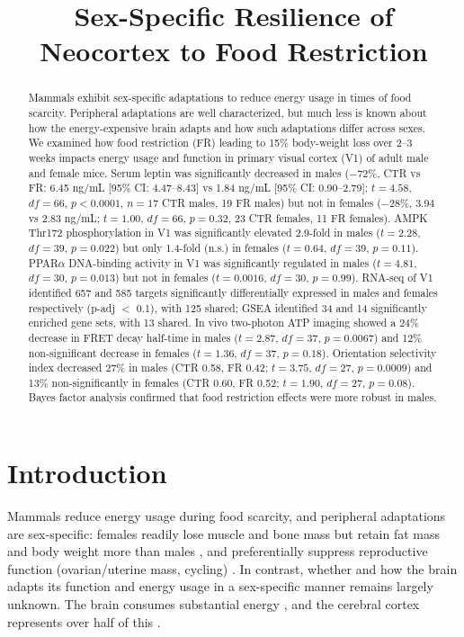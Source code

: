 \documentclass[11pt]{article}
\title{Sex-Specific Resilience of Neocortex to Food Restriction}
\author{}
\date{}
\begin{document}
\maketitle

\begin{abstract}
Mammals exhibit sex-specific adaptations to reduce energy usage in times of food scarcity. Peripheral adaptations are well characterized, but much less is known about how the energy-expensive brain adapts and how such adaptations differ across sexes. We examined how food restriction (FR) leading to 15\% body-weight loss over 2--3 weeks impacts energy usage and function in primary visual cortex (V1) of adult male and female mice. Serum leptin was significantly decreased in males ($-$72\%, CTR vs FR: 6.45 ng/mL [95\% CI: 4.47--8.43] vs 1.84 ng/mL [95\% CI: 0.90--2.79]; $t = 4.58$, $df = 66$, $p < 0.0001$, $n = 17$ CTR males, 19 FR males) but not in females ($-$28\%, 3.94 vs 2.83 ng/mL; $t = 1.00$, $df = 66$, $p = 0.32$, 23 CTR females, 11 FR females). AMPK Thr172 phosphorylation in V1 was significantly elevated 2.9-fold in males ($t = 2.28$, $df = 39$, $p = 0.022$) but only 1.4-fold (n.s.) in females ($t = 0.64$, $df = 39$, $p = 0.11$). PPAR$\alpha$ DNA-binding activity in V1 was significantly regulated in males ($t = 4.81$, $df = 30$, $p = 0.013$) but not in females ($t = 0.0016$, $df = 30$, $p = 0.99$). RNA-seq of V1 identified 657 and 585 targets significantly differentially expressed in males and females respectively (p-adj $<$ 0.1), with 125 shared; GSEA identified 34 and 14 significantly enriched gene sets, with 13 shared. In vivo two-photon ATP imaging showed a 24\% decrease in FRET decay half-time in males ($t = 2.87$, $df = 37$, $p = 0.0067$) and 12\% non-significant decrease in females ($t = 1.36$, $df = 37$, $p = 0.18$). Orientation selectivity index decreased 27\% in males (CTR 0.58, FR 0.42; $t = 3.75$, $df = 27$, $p = 0.0009$) and 13\% non-significantly in females (CTR 0.60, FR 0.52; $t = 1.90$, $df = 27$, $p = 0.08$). Bayes factor analysis confirmed that food restriction effects were more robust in males.
\end{abstract}

\section{Introduction}
Mammals reduce energy usage during food scarcity, and peripheral adaptations are sex-specific: females readily lose muscle and bone mass but retain fat mass and body weight more than males \cite{lamont2008gender,fontana2009aging,manzanares2019cognitive,palmer2017sexual,mitchell2016effects,shi2020sex}, and preferentially suppress reproductive function (ovarian/uterine mass, cycling) \cite{wade1996metabolic,nelson1997reproduction,caligioni2009assessing}. In contrast, whether and how the brain adapts its function and energy usage in a sex-specific manner remains largely unknown. The brain consumes substantial energy \cite{attwell2001energy,harris2012synaptic,niven2016neuronal}, and the cerebral cortex represents over half of this \cite{harris2012synaptic}.
\end{document}
